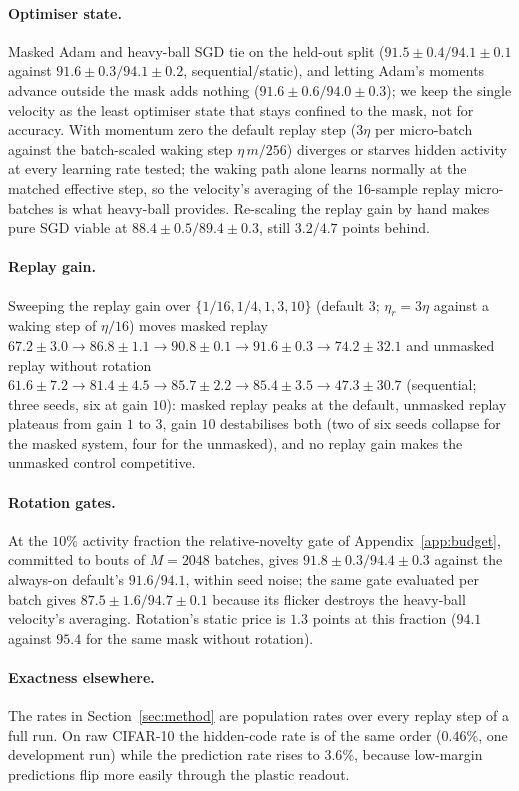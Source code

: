\documentclass{article}
\begin{document}
\paragraph{Optimiser state.} Masked Adam and heavy-ball SGD tie on the held-out split
($91.5\pm0.4/94.1\pm0.1$ against $91.6\pm0.3/94.1\pm0.2$, sequential/static), and letting
Adam's moments advance outside the mask adds nothing ($91.6\pm0.6/94.0\pm0.3$); we keep the
single velocity as the least optimiser state that stays confined to the mask, not for
accuracy. With momentum zero the default replay step ($3\eta$ per micro-batch against the
batch-scaled waking step $\eta\,m/256$) diverges or starves hidden activity at every learning
rate tested; the waking path alone learns normally at the matched effective step, so the
velocity's averaging of the $16$-sample replay micro-batches is what heavy-ball provides.
Re-scaling the replay gain by hand makes pure SGD viable at $88.4\pm0.5/89.4\pm0.3$, still
$3.2/4.7$ points behind.

\paragraph{Replay gain.} Sweeping the replay gain over $\{1/16,1/4,1,3,10\}$ (default $3$;
$\eta_r=3\eta$ against a waking step of $\eta/16$) moves masked replay
$67.2\pm3.0\to86.8\pm1.1\to90.8\pm0.1\to91.6\pm0.3\to74.2\pm32.1$ and unmasked replay
without rotation $61.6\pm7.2\to81.4\pm4.5\to85.7\pm2.2\to85.4\pm3.5\to47.3\pm30.7$
(sequential; three seeds, six at gain $10$): masked replay peaks at the default, unmasked
replay plateaus from gain $1$ to $3$, gain $10$ destabilises both (two of six seeds collapse
for the masked system, four for the unmasked), and no replay gain makes the unmasked control
competitive.

\paragraph{Rotation gates.} At the $10\%$ activity fraction the relative-novelty gate of
Appendix~\ref{app:budget}, committed to bouts of $M{=}2048$ batches, gives
$91.8\pm0.3/94.4\pm0.3$ against the always-on default's $91.6/94.1$, within seed noise; the
same gate evaluated per batch gives $87.5\pm1.6/94.7\pm0.1$ because its flicker destroys the
heavy-ball velocity's averaging. Rotation's static price is $1.3$ points at this fraction
($94.1$ against $95.4$ for the same mask without rotation).

\paragraph{Exactness elsewhere.} The rates in Section~\ref{sec:method} are population rates
over every replay step of a full run. On raw CIFAR-10 the hidden-code rate is of the same
order ($0.46\%$, one development run) while the prediction rate rises to $3.6\%$, because
low-margin predictions flip more easily through the plastic readout.
\end{document}
